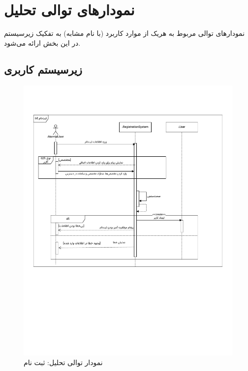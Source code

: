\chapter{نمودارهای توالی تحلیل}


نمودارهای توالی مربوط به هریک از موارد کاربرد (با نام مشابه) به تفکیک زیرسیستم در این بخش ارائه می‌شود.

\newpage
\section{زیرسیستم کاربری}

\begin{figure}[ht!]
	\centering
	\includegraphics[scale=0.6, page=1]{figs/OOD-Sequence-1.pdf}
	\caption{نمودار توالی تحلیل: ثبت نام}
\end{figure}
\FloatBarrier
\newpage


